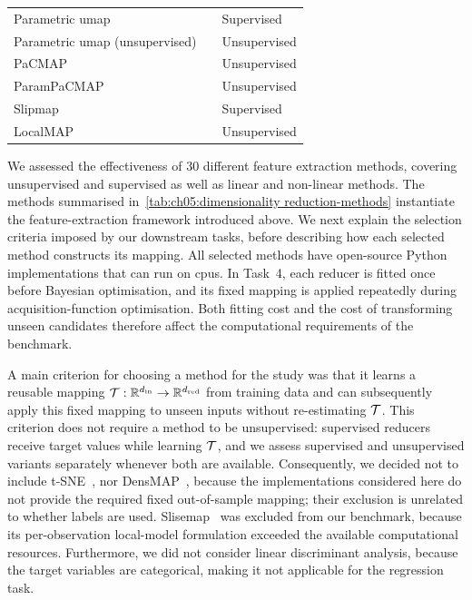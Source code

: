 \begin{table}
{\begin{tabularx}{\textwidth}{@{}>{\raggedright\arraybackslash}Xll@{}}
         Parametric \acrshort{umap} & \citet{SaiEtAl21} & Supervised\\
         Parametric \acrshort{umap} (unsupervised)&  \citet{SaiEtAl21} & Unsupervised\\
         PaCMAP & \citet{WanEtAl21} & Unsupervised\\
          ParamPaCMAP& \citet{HuaEtAl24} & Unsupervised\\
         Slipmap & \citet{BjoEtAl24} &Supervised\\

         LocalMAP & \citet{WanEtAl25} & Unsupervised\\

         \bottomrule
    \end{tabularx}
    }

\end{table}
We assessed the effectiveness of 30 different feature extraction methods,
covering unsupervised and supervised as well as linear and non-linear methods.
The methods summarised in~\cref{tab:ch05:dimensionality reduction-methods} instantiate the feature-extraction framework introduced above. We next explain the selection criteria imposed by our downstream tasks, before describing how each selected method constructs its mapping.
All selected methods have open-source Python implementations that can run on \glspl{cpu}. In Task~4, each reducer is fitted once before Bayesian optimisation, and its fixed mapping is applied repeatedly during acquisition-function optimisation. Both fitting cost and the cost of transforming unseen candidates therefore affect the computational requirements of the benchmark.

A main criterion for choosing a method for the study was that it learns a reusable mapping $\mathcal{T}: \mathbb{R}^{d_{\mathrm{in}}} \rightarrow \mathbb{R}^{d_{\mathrm{red}}}$ from training data and can subsequently apply this fixed mapping to unseen inputs without re-estimating $\mathcal{T}$.
This criterion does not require a method to be unsupervised: supervised reducers receive target values while learning $\mathcal{T}$, and we assess supervised and unsupervised variants separately whenever both are available.
Consequently, we decided not to include t-SNE~\citep{VanHin08}, nor DensMAP~\citep{NarEtAl21}, because the implementations considered here do not provide the required fixed out-of-sample mapping; their exclusion is unrelated to whether labels are used.
Slisemap~\citep{BjoEtAl23} was excluded from our benchmark, because its per-observation local-model formulation exceeded the available computational resources.
Furthermore, we did not consider linear discriminant analysis, because the target variables are categorical, making it not applicable for the regression task.

